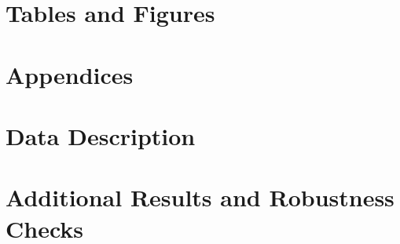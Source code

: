 \documentclass[a4paper,12pt]{article}
\begin{document}
\clearpage
\singlespacing



\clearpage
\centering
\section*{Tables and Figures}

\setcounter{table}{0}
\setcounter{figure}{0}


\clearpage




\clearpage

\clearpage

\clearpage

\clearpage

\restoregeometry
\clearpage
\centering
\section*{Appendices}
\appendix

\section{\label{Appendix A} Data Description}

\setcounter{table}{0}
\setcounter{figure}{0}
\renewcommand{\thetable}{A\arabic{table}}
\renewcommand{\thefigure}{A\arabic{figure}}




\clearpage
\section{\label{Appendix B} Additional Results and Robustness Checks}
\setcounter{table}{0}
\setcounter{figure}{0}
\end{document}
